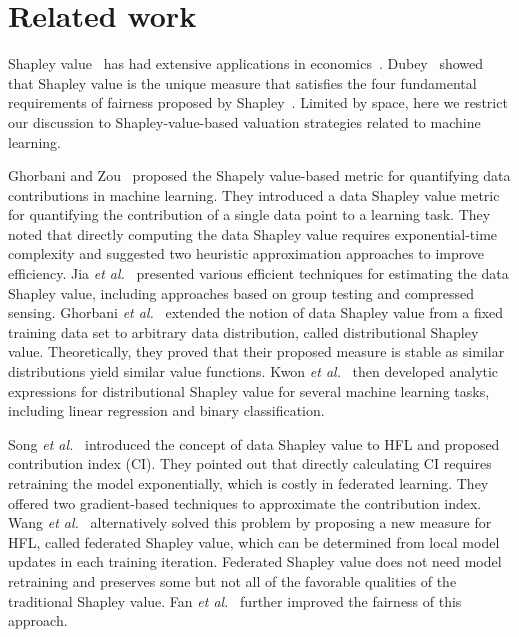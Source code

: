 \section{Related work} \label{sec:8-2}

Shapley value~\cite{shapley201617} has had extensive applications in economics~\cite{gul1989bargaining}. Dubey~\cite{dubey1975uniqueness} showed that Shapley value is the unique measure that satisfies the four fundamental requirements of fairness proposed by Shapley~\cite{shapley201617}. Limited by space, here we restrict our discussion to Shapley-value-based valuation strategies related to machine learning. 

Ghorbani and Zou~\cite{ghorbani2019data} proposed the Shapely value-based metric for quantifying data contributions in machine learning. They introduced a data Shapley value metric for quantifying the contribution of a single data point to a learning task. They noted that directly computing the data Shapley value requires exponential-time complexity and suggested two heuristic approximation approaches to improve efficiency. Jia \textit{et al.}~\cite{jia2019towards} presented various efficient techniques for estimating the data Shapley value, including approaches based on group testing and compressed sensing. Ghorbani \textit{et al.}~\cite{ghorbani2020distributional} extended the notion of data Shapley value from a fixed training data set to arbitrary data distribution, called distributional Shapley value. Theoretically, they proved that their proposed measure is stable as similar distributions yield similar value functions. Kwon \textit{et al.}~\cite{kwon2021efficient} then developed analytic expressions for distributional Shapley value for several machine learning tasks, including linear regression and binary classification.

Song \textit{et al.}~\cite{song2019profit} introduced the concept of data Shapley value to HFL and proposed contribution index (CI). They pointed out that directly calculating CI requires retraining the model exponentially, which is costly in federated learning. They offered two gradient-based techniques to approximate the contribution index. Wang \textit{et al.}~\cite{wang2020principled} alternatively solved this problem by proposing a new measure for HFL, called federated Shapley value, which can be determined from local model updates in each training iteration. Federated Shapley value does not need model retraining and preserves some but not all of the favorable qualities of the traditional Shapley value. Fan \textit{et al.}~\cite{fan2021improving} further improved the fairness of this approach. 

